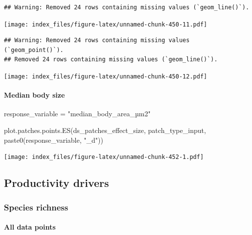 \documentclass[
]{article}
\newenvironment{Shaded}{\begin{snugshade}}{\end{snugshade}}
\newcommand{\FunctionTok}[1]{\textcolor[rgb]{0.00,0.00,0.00}{#1}}
\newcommand{\NormalTok}[1]{#1}
\newcommand{\OtherTok}[1]{\textcolor[rgb]{0.56,0.35,0.01}{#1}}
\newcommand{\StringTok}[1]{\textcolor[rgb]{0.31,0.60,0.02}{#1}}
\begin{document}
\begin{verbatim}
## Warning: Removed 24 rows containing missing values (`geom_line()`).
\end{verbatim}

\texttt{[image: index\_files/figure-latex/unnamed-chunk-450-11.pdf]}

\begin{verbatim}
## Warning: Removed 24 rows containing missing values (`geom_point()`).
## Removed 24 rows containing missing values (`geom_line()`).
\end{verbatim}

\texttt{[image: index\_files/figure-latex/unnamed-chunk-450-12.pdf]}

\hypertarget{median-body-size-3}{%
\paragraph{Median body size}\label{median-body-size-3}}

\begin{Shaded}
\begin{Highlighting}[]
\NormalTok{response\_variable }\OtherTok{=} \StringTok{"median\_body\_area\_µm2"}
\end{Highlighting}
\end{Shaded}

\begin{Shaded}
\begin{Highlighting}[]
\FunctionTok{plot.patches.points.ES}\NormalTok{(ds\_patches\_effect\_size, }
\NormalTok{                       patch\_type\_input,}
                       \FunctionTok{paste0}\NormalTok{(response\_variable, }\StringTok{"\_d"}\NormalTok{))}
\end{Highlighting}
\end{Shaded}

\texttt{[image: index\_files/figure-latex/unnamed-chunk-452-1.pdf]}

\hypertarget{productivity-drivers}{%
\subsection{Productivity drivers}\label{productivity-drivers}}

\hypertarget{species-richness-3}{%
\subsubsection{Species richness}\label{species-richness-3}}

\hypertarget{all-data-points}{%
\paragraph{All data points}\label{all-data-points}}
\end{document}
